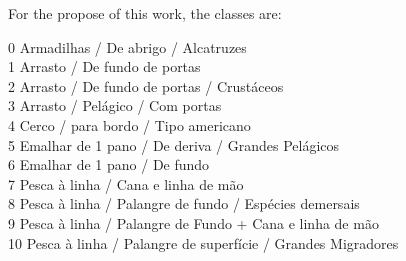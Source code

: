 For the propose of this work, the classes are: 

0	Armadilhas / De abrigo / Alcatruzes \\
1	Arrasto / De fundo de portas \\
2	Arrasto / De fundo de portas / Crustáceos\\
3	Arrasto / Pelágico / Com portas\\
4	Cerco / para bordo / Tipo americano\\
5	Emalhar de 1 pano / De deriva / Grandes Pelágicos\\
6	Emalhar de 1 pano / De fundo\\
7	Pesca à linha / Cana e linha de mão\\
8	Pesca à linha / Palangre de fundo / Espécies demersais\\
9	Pesca à linha / Palangre de Fundo + Cana e linha de mão\\
10	Pesca à linha / Palangre de superfície / Grandes Migradores



